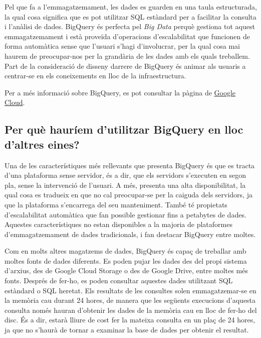 \documentclass[11pt,longbibliography]{article}
\theoremstyle{definition}
\theoremstyle{remark}
\begin{document}
Pel que fa a l’emmagatzemament, les dades es guarden en una taula estructurada, la qual cosa significa que es pot utilitzar SQL estàndard per a facilitar la consulta i l’anàlisi de dades. BigQuery és perfecta pel \textit{Big Data} perquè gestiona tot aquest emmagatzemament i està proveïda d’operacions d’escalabilitat que funcionen de forma automàtica sense que l’usuari s’hagi d’involucrar,  per la qual cosa mai haurem de preocupar-nos per la grandària de les dades amb els quals treballem. Part de la consideració de disseny darrere de BigQuery és animar als usuaris a centrar-se en els coneixements en lloc de la infraestructura. 

\noindent
Per a més informació sobre BigQuery, es pot consultar la pàgina de \href{https://cloud.google.com/bigquery/docs/introduction}{Google Cloud}.

\subsection{Per què hauríem d'utilitzar BigQuery en lloc d'altres eines?}

Una de les característiques més rellevants que presenta BigQuery és que es tracta d'una plataforma sense servidor, és a dir, que els servidors s'executen en segon pla, sense la intervenció de l'usuari. A més, presenta una alta disponibilitat, la qual cosa es tradueix en que no cal preocupar-se per la caiguda dels servidors, ja que la plataforma s'encarrega del seu manteniment. També té propietats d'escalabilitat automàtica que fan possible gestionar fins a petabytes de dades. Aquestes característiques no estan disponibles a la majoria de plataformes d'emmagatzemament de dades tradicionals, i fan destacar BigQuery entre moltes.



Com en molts altres magatzems de dades, BigQuery és capaç de treballar amb moltes fonts de dades diferents. Es poden pujar les dades des del propi sistema d'arxius, des de Google Cloud Storage o des de Google Drive, entre moltes més fonts. Després de fer-ho, es poden consultar aquestes dades utilitzant SQL estàndard o SQL heretat. Els resultats de les consultes solen emmagatzemar-se en la memòria cau durant 24 hores, de manera que les següents execucions d'aquesta consulta només hauran d'obtenir les dades de la memòria cau en lloc de fer-ho del disc. És a dir, estarà lliure de cost fer la mateixa consulta en un plaç de 24 hores, ja que no s'haurà de tornar a examinar la base de dades per obtenir el resultat.
\end{document}
